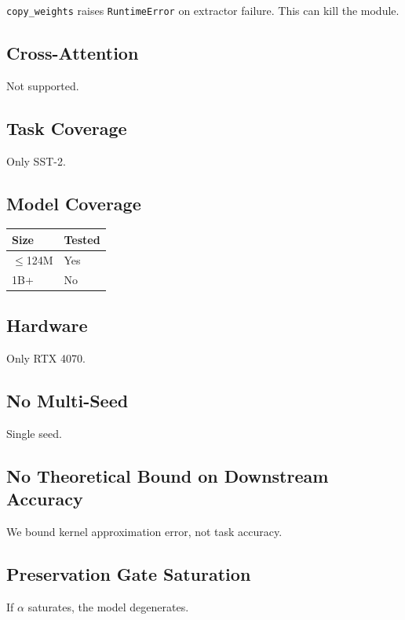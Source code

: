 \texttt{copy\_weights} raises \texttt{RuntimeError} on extractor failure. This can kill 
the module.

\subsection{Cross-Attention}

Not supported.

\subsection{Task Coverage}

Only SST-2.

\subsection{Model Coverage}

\begin{table}[H]
\centering
\small
\begin{tabular}{ll}
\toprule
\textbf{Size} & \textbf{Tested} \\
\midrule
$\le$124M & Yes \\
1B+ & No \\
\bottomrule
\end{tabular}
\end{table}

\subsection{Hardware}

Only RTX 4070.

\subsection{No Multi-Seed}

Single seed.

\subsection{No Theoretical Bound on Downstream Accuracy}

We bound kernel approximation error, not task accuracy.

\subsection{Preservation Gate Saturation}

If $\alpha$ saturates, the model degenerates.

